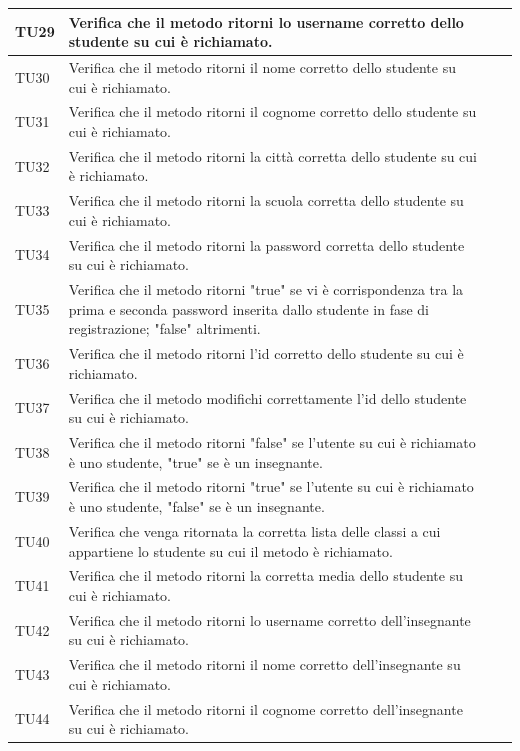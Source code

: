\begin{longtable}{|>{\centering\arraybackslash}m{1.6cm}|>{\centering\arraybackslash}m{6.41cm}|>{\centering\arraybackslash}m{3.1cm}| c |}
		TU29 & Verifica che il metodo ritorni lo username corretto dello studente su cui è richiamato.\\ \hline
		\rowcolor{LightGray}
		TU30 & Verifica che il metodo ritorni il nome corretto dello studente su cui è richiamato.  \\ \hline
		TU31 & Verifica che il metodo ritorni il cognome corretto dello studente su cui è richiamato. \\ \hline
		\rowcolor{LightGray}
		TU32 & Verifica che il metodo ritorni la città corretta dello studente su cui è richiamato.\\ \hline
		TU33 & Verifica che il metodo ritorni la scuola corretta dello studente su cui è richiamato. \\ \hline
		\rowcolor{LightGray}
		TU34 & Verifica che il metodo ritorni la password corretta dello studente su cui è richiamato. \\ \hline
		TU35 & Verifica che il metodo ritorni "true" se vi è corrispondenza tra la prima e seconda password inserita dallo studente in fase di registrazione; "false" altrimenti.  \\ \hline
		\rowcolor{LightGray}
		TU36 & Verifica che il metodo ritorni l'id corretto dello studente su cui è richiamato.\\ \hline
		TU37 & Verifica che il metodo modifichi correttamente l'id dello studente su cui è richiamato. \\ \hline
		\rowcolor{LightGray}
		TU38 & Verifica che il metodo ritorni "false" se l'utente su cui è richiamato è uno studente, "true" se è un insegnante. \\ \hline
		TU39 & Verifica che il metodo ritorni "true" se l'utente su cui è richiamato è uno studente, "false" se è un insegnante. \\ \hline
		\rowcolor{LightGray}
		TU40 & Verifica che venga ritornata la corretta lista delle classi a cui appartiene lo studente su cui il metodo è richiamato.  \\ \hline
		TU41 & Verifica che il metodo ritorni la corretta media dello studente su cui è richiamato. \\ \hline
		\rowcolor{LightGray}
		TU42 & Verifica che il metodo ritorni lo username corretto dell'insegnante su cui è richiamato.\\ \hline
		TU43 & Verifica che il metodo ritorni il nome corretto dell'insegnante su cui è richiamato.  \\ \hline
		\rowcolor{LightGray}
		TU44 & Verifica che il metodo ritorni il cognome corretto dell'insegnante su cui è richiamato. \\ \hline

\end{longtable}
